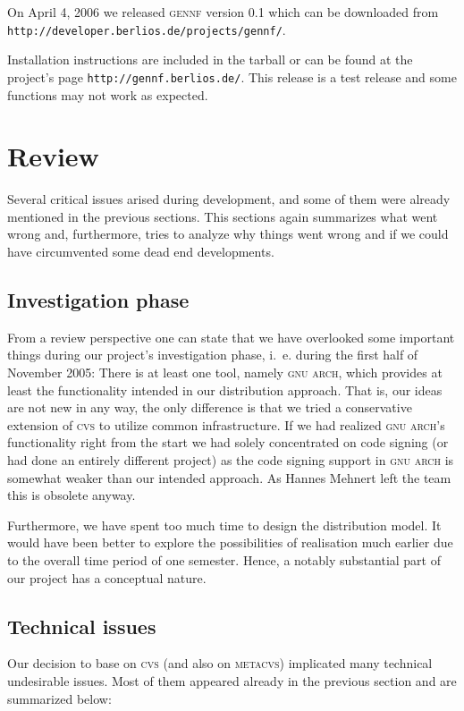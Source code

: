 \documentclass[fleqn, 10pt, a4paper]{report} \usepackage{amssymb}
\newcommand{\GENNF}{\textsc{gennf}}
\begin{document}
On April 4, 2006 we released \GENNF{} version 0.1 which can be
downloaded from \texttt{http://developer.berlios.de/projects/gennf/}.

Installation instructions are included in the tarball or can be found
at the project's page \texttt{http://gennf.berlios.de/}. This release
is a test release and some functions may not work as expected.


\section{Review}

Several critical issues arised during development, and some of them
were already mentioned in the previous sections. This sections again
summarizes what went wrong and, furthermore, tries to analyze why
things went wrong and if we could have circumvented some dead end
developments.


\subsection{Investigation phase}

From a review perspective one can state that we have overlooked some
important things during our project's investigation phase, i.~e.
during the first half of November 2005: There is at least one tool,
namely \textsc{gnu arch}, which provides at least the functionality
intended in our distribution approach. That is, our ideas are not new
in any way, the only difference is that we tried a conservative
extension of \textsc{cvs} to utilize common infrastructure.  If we had
realized \textsc{gnu arch}'s functionality right from the start we had
solely concentrated on code signing (or had done an entirely different
project) as the code signing support in \textsc{gnu arch} is somewhat
weaker than our intended approach. As Hannes Mehnert left the team
this is obsolete anyway.

Furthermore, we have spent too much time to design the distribution
model. It would have been better to explore the possibilities of
realisation much earlier due to the overall time period of one
semester. Hence, a notably substantial part of our project has a
conceptual nature.


\subsection{Technical issues}

Our decision to base on \textsc{cvs} (and also on \textsc{metacvs})
implicated many technical undesirable issues. Most of them appeared
already in the previous section and are summarized below:
\end{document}
